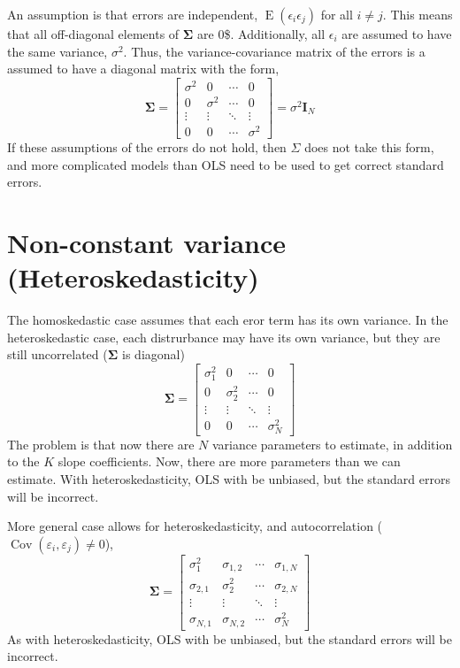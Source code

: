 \documentclass[]{book}
\DeclareMathOperator{\E}{E}
\DeclareMathOperator{\Cov}{Cov}
\newcommand{\mat}[1]{\boldsymbol{#1}}
\begin{document}
An assumption is that errors are independent,
\(\E(\epsilon_i \epsilon_j)\) for all \(i \neq j\). This means that all
off-diagonal elements of \(\mat{\Sigma}\) are 0\$. Additionally, all
\(\epsilon_i\) are assumed to have the same variance, \(\sigma^2\).
Thus, the variance-covariance matrix of the errors is a assumed to have
a diagonal matrix with the form, \[
\mat{\Sigma} = 
\begin{bmatrix}
\sigma^2 & 0 & \cdots & 0 \\
0 & \sigma^2 & \cdots & 0 \\
\vdots & \vdots & \ddots & \vdots \\
0 & 0 & \cdots & \sigma^2
\end{bmatrix} 
= \sigma^2 \mat{I}_N
\] If these assumptions of the errors do not hold, then \(\Sigma\) does
not take this form, and more complicated models than OLS need to be used
to get correct standard errors.

\section{Non-constant variance
(Heteroskedasticity)}\label{non-constant-variance-heteroskedasticity}

The homoskedastic case assumes that each eror term has its own variance.
In the heteroskedastic case, each distrurbance may have its own
variance, but they are still uncorrelated (\(\mat{\Sigma}\) is diagonal)
\[
\mat{\Sigma} = 
\begin{bmatrix}
\sigma_1^2 & 0 & \cdots & 0 \\
0 & \sigma_2^2 & \cdots & 0 \\
\vdots & \vdots & \ddots & \vdots \\
0 & 0 & \cdots & \sigma_N^2
\end{bmatrix}
\] The problem is that now there are \(N\) variance parameters to
estimate, in addition to the \(K\) slope coefficients. Now, there are
more parameters than we can estimate. With heteroskedasticity, OLS with
be unbiased, but the standard errors will be incorrect.

More general case allows for heteroskedasticity, and autocorrelation
(\(\Cov(\varepsilon_i, \varepsilon_j) \neq 0\)), \[
\mat{\Sigma} = 
\begin{bmatrix}
\sigma_1^2 & \sigma_{1,2} & \cdots & \sigma_{1,N} \\
\sigma_{2,1} & \sigma_2^2 & \cdots & \sigma_{2,N} \\
\vdots & \vdots & \ddots & \vdots \\
\sigma_{N,1} & \sigma_{N,2} & \cdots & \sigma_N^2
\end{bmatrix} 
\] As with heteroskedasticity, OLS with be unbiased, but the standard
errors will be incorrect.
\end{document}
